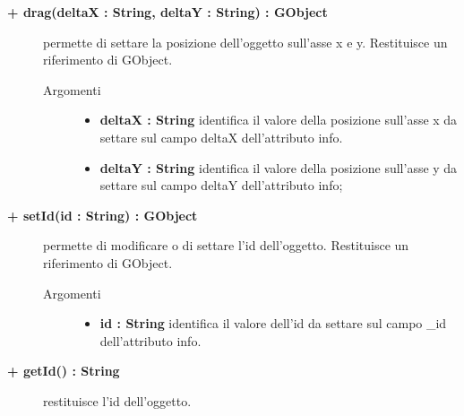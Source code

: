 \begin{description}
\begin{description}
\end{description}

\begin{description}
		\item[\textbf{\color{blue}+ drag(deltaX : String, deltaY : String) : GObject			}] \hfill
			permette di settare la posizione dell'oggetto sull'asse x e y. Restituisce un riferimento di GObject.
			
		\begin{description}
			\item[Argomenti] \hfill
				\begin{itemize}
				
					\item \textbf{deltaX : String			} \hfill
					identifica il valore della posizione sull'asse x da settare sul campo deltaX dell'attributo info.
					\item \textbf{deltaY : String			} \hfill
					identifica il valore della posizione sull'asse y da settare sul campo deltaY dell'attributo info;				
				\end{itemize}
		\end{description}
		
\end{description}

\begin{description}
		\item[\textbf{\color{blue}+ setId(id : String) : GObject			}] \hfill
			permette di modificare o di settare l'id dell'oggetto. Restituisce un riferimento di GObject.
			
		\begin{description}
			\item[Argomenti] \hfill
				\begin{itemize}
				
					\item \textbf{id : String			} \hfill
					identifica il valore dell'id da settare sul campo \_id dell'attributo info.
				\end{itemize}
		\end{description}
		
\end{description}

\begin{description}
		\item[\textbf{\color{blue}+ getId() : String			}] \hfill
			restituisce l'id dell'oggetto.
\end{description}


\end{description}

